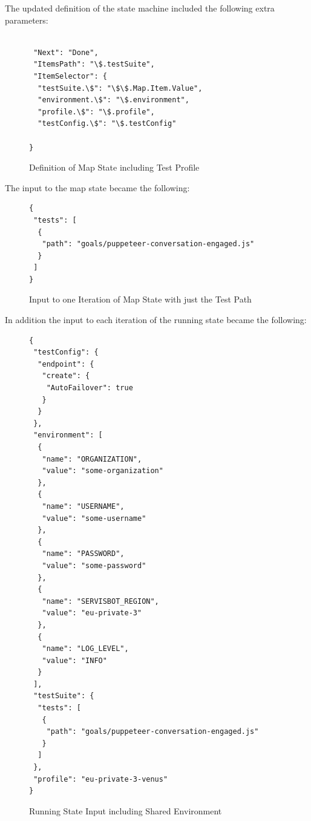 \documentclass[12pt,a4paper,titlepage]{report}
\begin{document}
The updated definition of the state machine included the following extra parameters:

\begin{figure}[H]
 \begin{tcolorbox}
  \begin{verbatim}

 "Next": "Done",
 "ItemsPath": "\$.testSuite",
 "ItemSelector": {
  "testSuite.\$": "\$\$.Map.Item.Value",
  "environment.\$": "\$.environment",
  "profile.\$": "\$.profile",
  "testConfig.\$": "\$.testConfig"

}
\end{verbatim}
 \end{tcolorbox}
 \caption{Definition of Map State including Test Profile}
\end{figure}

The input to the map state became the following:

\begin{figure}[ht]
 \begin{tcolorbox}
  \begin{verbatim}
{
 "tests": [
  {
   "path": "goals/puppeteer-conversation-engaged.js"
  }
 ]
}
\end{verbatim}
 \end{tcolorbox}
 \caption{Input to one Iteration of Map State with just the Test Path}
\end{figure}

In addition the input to each iteration of the running state became the following:

\begin{figure}[H]
 \begin{tcolorbox}
  \begin{verbatim}
{
 "testConfig": {
  "endpoint": {
   "create": {
    "AutoFailover": true
   }
  }
 },
 "environment": [
  {
   "name": "ORGANIZATION",
   "value": "some-organization"
  },
  {
   "name": "USERNAME",
   "value": "some-username"
  },
  {
   "name": "PASSWORD",
   "value": "some-password"
  },
  {
   "name": "SERVISBOT_REGION",
   "value": "eu-private-3"
  },
  {
   "name": "LOG_LEVEL",
   "value": "INFO"
  }
 ],
 "testSuite": {
  "tests": [
   {
    "path": "goals/puppeteer-conversation-engaged.js"
   }
  ]
 },
 "profile": "eu-private-3-venus"
}

\end{verbatim}
 \end{tcolorbox}
 \caption{Running State Input including Shared Environment}
\end{figure}
\end{document}
